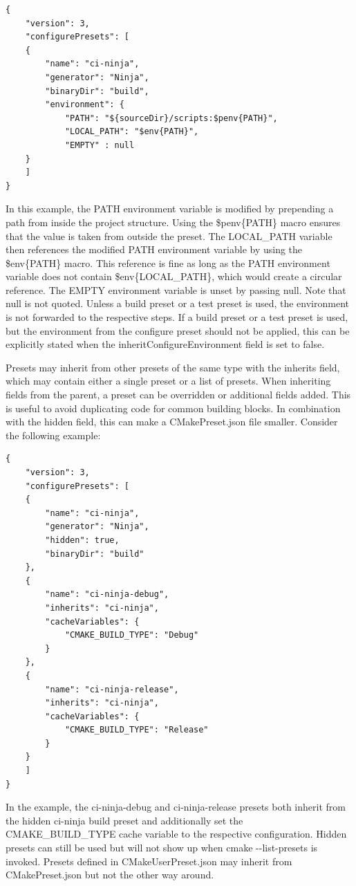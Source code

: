 \begin{lstlisting}[style=styleCMake]
{
	"version": 3,
	"configurePresets": [
	{
		"name": "ci-ninja",
		"generator": "Ninja",
		"binaryDir": "build",
		"environment": {
			"PATH": "${sourceDir}/scripts:$penv{PATH}",
			"LOCAL_PATH": "$env{PATH}",
			"EMPTY" : null
	}
	]
}
\end{lstlisting}

In this example, the PATH environment variable is modified by prepending a path from inside the project structure. Using the \$penv\{PATH\} macro ensures that the value is taken from outside the preset. The LOCAL\_PATH variable then references the modified PATH environment variable by using the \$env\{PATH\} macro. This reference is fine as long as the PATH environment variable does not contain \$env\{LOCAL\_PATH\}, which would create a circular reference. The EMPTY environment variable is unset by passing null. Note that null is not quoted. Unless a build preset or a test preset is used, the environment is not forwarded to the respective steps. If a build preset or a test preset is used, but the environment from the configure preset should not be applied, this can be explicitly stated when the inheritConfigureEnvironment field is set to false.


Presets may inherit from other presets of the same type with the inherits field, which may contain either a single preset or a list of presets. When inheriting fields from the parent, a preset can be overridden or additional fields added. This is useful to avoid duplicating code for common building blocks. In combination with the hidden field, this can make a CMakePreset.json file smaller. Consider the following example:

\begin{lstlisting}[style=styleCMake]
{
	"version": 3,
	"configurePresets": [
	{
		"name": "ci-ninja",
		"generator": "Ninja",
		"hidden": true,
		"binaryDir": "build"
	},
	{
		"name": "ci-ninja-debug",
		"inherits": "ci-ninja",
		"cacheVariables": {
			"CMAKE_BUILD_TYPE": "Debug"
		}
	},
	{
		"name": "ci-ninja-release",
		"inherits": "ci-ninja",
		"cacheVariables": {
			"CMAKE_BUILD_TYPE": "Release"
		}
	}
	]
}
\end{lstlisting}

In the example, the ci-ninja-debug and ci-ninja-release presets both inherit from the hidden ci-ninja build preset and additionally set the CMAKE\_BUILD\_TYPE cache variable to the respective configuration. Hidden presets can still be used but will not show up when cmake -{}-list-presets is invoked. Presets defined in CMakeUserPreset.json may inherit from CMakePreset.json but not the other way around.


